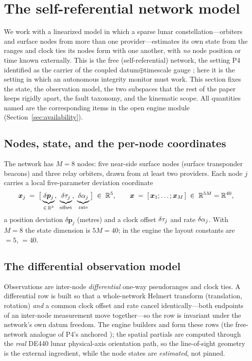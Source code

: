 \section{The self-referential network model}
\label{sec:model}

We work with a linearized model in which a sparse lunar constellation---orbiters and
surface nodes from more than one provider---estimates its own state from the ranges and
clock ties its nodes form with one another, with \emph{no} node position or time known
externally. This is the free (self-referential) network, the setting P4 identified as the
carrier of the coupled datum$\oplus$timescale gauge \citep{baweja2026gauge}; here it is the
setting in which an autonomous integrity monitor must work. This section fixes the state,
the observation model, the two subspaces that the rest of the paper keeps rigidly apart, the
fault taxonomy, and the kinematic scope. All quantities named  are the
corresponding items in the open engine module 
(Section~\ref{sec:availability}).

\subsection{Nodes, state, and the per-node coordinates}
\label{sec:state}

The network has $M=8$ nodes: five near-side surface nodes (surface transponder beacons) and
three relay orbiters, drawn from at least two providers. Each node $j$ carries a local
five-parameter deviation coordinate
\begin{equation}
  \bm{x}_j \;=\; \bigl[\,\underbrace{\delta\bm p_j}_{\in\,\mathbb{R}^3},\;
                       \underbrace{\delta\tau_j}_{\text{offset}},\;
                       \underbrace{\delta\alpha_j}_{\text{rate}}\,\bigr]\;\in\;\mathbb{R}^{5},
  \qquad
  \bm{x} \;=\; [\,\bm{x}_1;\dots;\bm{x}_M\,]\;\in\;\mathbb{R}^{5M}=\mathbb{R}^{40},
  \label{eq:state}
\end{equation}
a position deviation $\delta\bm p_j$ (metres) and a clock offset $\delta\tau_j$ and rate
$\delta\alpha_j$. With $M=8$ the state dimension is $5M=40$; in the engine the layout constants
are ${}=5$, ${}=40$.

\subsection{The differential observation model}
\label{sec:obsmodel}

Observations are inter-node \emph{differential} one-way pseudoranges and clock ties. A
differential row is built so that a whole-network Helmert transform (translation, rotation)
\emph{and} a common clock offset and rate cancel identically---both endpoints of an
inter-node measurement move together---so the row is invariant under the network's own datum
freedom. The engine builders  and
 form these rows (the free-network analogue of P4's
anchored ); the spatial partials are computed through the
\emph{real} DE440 lunar physical-axis orientation path, so the line-of-sight geometry is the
external ingredient, while the node states are \emph{estimated}, not pinned.


